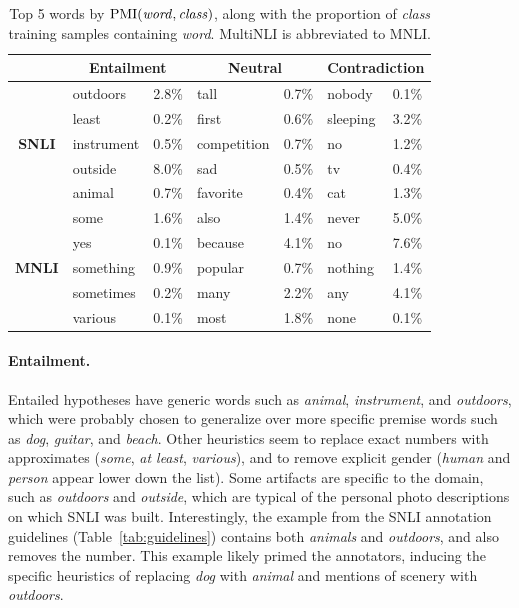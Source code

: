 \begin{table}
\setlength{\tabcolsep}{2pt}
\centering
\footnotesize{
\begin{tabular}{cllllll}
\toprule
 & \multicolumn{2}{c}{\textbf{Entailment}} & \multicolumn{2}{c}{\textbf{Neutral}} & \multicolumn{2}{c}{\textbf{Contradiction}} \\
\midrule
\multirow{5}{*}{\textbf{SNLI}}       & outdoors & 2.8\%     & tall & 0.7\%          & nobody & 0.1\% \\
                            & least & 0.2\%         & first & 0.6\%         & sleeping & 3.2\% \\
                            & instrument & 0.5\%   & competition & 0.7\%   & no & 1.2\% \\
                            & outside  & 8.0\%     & sad  & 0.5\%         & tv & 0.4\% \\
                            & animal & 0.7\%       & favorite & 0.4\%     & cat  & 1.3\% \\
\midrule
\multirow{5}{*}{\textbf{MNLI}}       & some & 1.6\%           & also & 1.4\%          & never & 5.0\% \\
                            & yes  & 0.1\%         & because & 4.1\%      & no & 7.6\% \\
                            & something & 0.9\%    & popular & 0.7\%      & nothing & 1.4\% \\
                            & sometimes & 0.2\%     & many & 2.2\%          & any & 4.1\% \\
                            & various & 0.1\%       & most & 1.8\%          & none & 0.1\% \\
\bottomrule
\end{tabular}
}
\caption{Top 5 words by $\text{PMI}(\text{\textit{word}}, \text{\textit{class}})$,
along with the proportion of {\it class} training samples  containing {\it word}. MultiNLI is abbreviated to MNLI.}
\label{tab:pmi}
\end{table}


\paragraph{Entailment.}
Entailed hypotheses have generic words such as \textit{animal}, \textit{instrument}, and \textit{outdoors}, which were probably chosen to generalize over more specific premise words such as \textit{dog}, \textit{guitar}, and \textit{beach}.
Other heuristics seem to replace exact numbers with approximates (\textit{some}, \textit{at least}, \textit{various}), and to remove explicit gender (\textit{human} and \textit{person} appear lower down the list).
Some artifacts are specific to the domain, such as \textit{outdoors} and \textit{outside}, which are typical of the personal photo descriptions on which SNLI was built.
Interestingly, the example from the SNLI annotation guidelines (Table~\ref{tab:guidelines}) contains both \textit{animals} and \textit{outdoors}, and also removes the number. 
This example likely primed the annotators, inducing the specific heuristics of replacing \textit{dog} with \textit{animal} and mentions of scenery with \textit{outdoors}.

